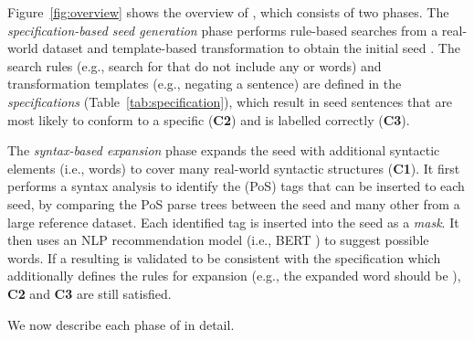 Figure~\ref{fig:overview} shows the overview of \tool{}, which
consists of two phases.  The \emph{specification-based seed
  generation} phase performs rule-based searches from a real-world
dataset and template-based transformation to obtain the
initial seed \sents.  The search rules (e.g., search for \neu
\sents that do not include any \pstv or \ngtv words) and
transformation templates (e.g., negating a sentence) are defined in the \emph{\lc
  specifications} (Table~\ref{tab:specification}), which result in seed sentences that are most likely to conform
to a specific \lc ({\bf C2}) and is labelled
correctly ({\bf C3}).

The \emph{syntax-based \sent expansion} phase expands the seed
\sents with additional syntactic elements (i.e., words) to cover many real-world
syntactic structures ({\bf C1}). It first performs a syntax analysis
to identify the \pos (PoS) tags that can be inserted to each
seed, by comparing the PoS parse trees between the seed \sent and
many other \sents from a large reference dataset. Each identified
tag is inserted into the seed as a \emph{mask}. It then uses an NLP
recommendation model (i.e., BERT \cite{devlin2019bert}) to suggest possible
words. If a resulting \sent is validated to be consistent with the
specification which additionally defines the rules for expansion
(e.g., the expanded word should be \neu), {\bf C2} and {\bf C3} are
still satisfied.

We now describe each phase of \tool{} in detail.


